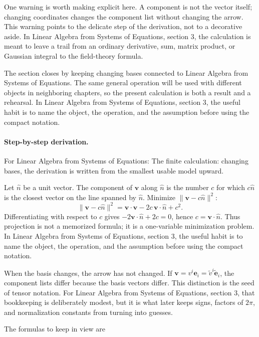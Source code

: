 One warning is worth making explicit here.  A component is not the vector itself; changing coordinates changes the component list without changing the arrow.  This warning points to the delicate step of the derivation, not to a decorative aside.  In Linear Algebra from Systems of Equations, section 3, the calculation is meant to leave a trail from an ordinary derivative, sum, matrix product, or Gaussian integral to the field-theory formula.

The section closes by keeping changing bases connected to Linear Algebra from Systems of Equations.  The same general operation will be used with different objects in neighboring chapters, so the present calculation is both a result and a rehearsal.  In Linear Algebra from Systems of Equations, section 3, the useful habit is to name the object, the operation, and the assumption before using the compact notation.



\paragraph{Step-by-step derivation.}

For Linear Algebra from Systems of Equations: The finite calculation: changing bases, the derivation is written from the smallest usable model upward.

Let \(\hat n\) be a unit vector.  The component of \(\bm v\) along \(\hat n\) is the number \(c\) for which \(c\hat n\) is the closest vector on the line spanned by \(\hat n\).  Minimize \(\|\bm v-c\hat n\|^2\):
\[
  \|\bm v-c\hat n\|^2=\bm v\cdot\bm v-2c\,\bm v\cdot\hat n+c^2.
\]
Differentiating with respect to \(c\) gives \(-2\bm v\cdot\hat n+2c=0\), hence \(c=\bm v\cdot\hat n\).  Thus projection is not a memorized formula; it is a one-variable minimization problem.  In Linear Algebra from Systems of Equations, section 3, the useful habit is to name the object, the operation, and the assumption before using the compact notation.

When the basis changes, the arrow has not changed.  If \(\bm v=v^i\bm e_i=\tilde v^i\tilde{\bm e}_i\), the component lists differ because the basis vectors differ.  This distinction is the seed of tensor notation.  For Linear Algebra from Systems of Equations, section 3, that bookkeeping is deliberately modest, but it is what later keeps signs, factors of \(2\pi\), and normalization constants from turning into guesses.

The formulas to keep in view are

